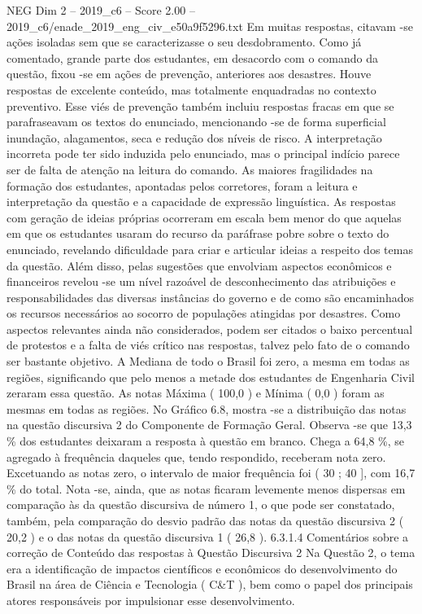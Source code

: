 \begin{textsample}{NEG Dim 2 – 2019\_c6 – Score 2.00 – 2019\_c6/enade\_2019\_eng\_civ\_e50a9f5296.txt}
Em muitas respostas, citavam -se ações isoladas sem que se caracterizasse o seu desdobramento.
Como já comentado, grande parte dos estudantes, em desacordo com o comando da questão, fixou -se em ações de prevenção, anteriores aos desastres.
Houve respostas de excelente conteúdo, mas totalmente enquadradas no contexto preventivo.
Esse viés de prevenção também incluiu respostas fracas em que se parafraseavam os textos do enunciado, mencionando -se de forma superficial inundação, alagamentos, seca e redução dos níveis de risco.
A interpretação incorreta pode ter sido induzida pelo enunciado, mas o principal indício parece ser de falta de atenção na leitura do comando.
As maiores fragilidades na formação dos estudantes, apontadas pelos corretores, foram a leitura e interpretação da questão e a capacidade de expressão linguística.
As respostas com geração de ideias próprias ocorreram em escala bem menor do que aquelas em que os estudantes usaram do recurso da paráfrase pobre sobre o texto do enunciado, revelando dificuldade para criar e articular ideias a respeito dos temas da questão.
Além disso, pelas sugestões que envolviam aspectos econômicos e financeiros revelou -se um nível razoável de desconhecimento das atribuições e responsabilidades das diversas instâncias do governo e de como são encaminhados os recursos necessários ao socorro de populações atingidas por desastres.
Como aspectos relevantes ainda não considerados, podem ser citados o baixo percentual de protestos e a falta de viés crítico nas respostas, talvez pelo fato de o comando ser bastante objetivo.
A Mediana de todo o Brasil foi zero, a mesma em todas as regiões, significando que pelo menos a metade dos estudantes de Engenharia Civil zeraram essa questão.
As notas Máxima ( 100,0 ) e Mínima ( 0,0 ) foram as mesmas em todas as regiões.
No Gráfico 6.8, mostra -se a distribuição das notas na questão discursiva 2 do Componente de Formação Geral.
Observa -se que 13,3 \% dos estudantes deixaram a resposta à questão em branco.
Chega a 64,8 \%, se agregado à frequência daqueles que, tendo respondido, receberam nota zero.
Excetuando as notas zero, o intervalo de maior frequência foi ( 30 ; 40 ], com 16,7 \% do total.
Nota -se, ainda, que as notas ficaram levemente menos dispersas em comparação às da questão discursiva de número 1, o que pode ser constatado, também, pela comparação do desvio padrão das notas da questão discursiva 2 ( 20,2 ) e o das notas da questão discursiva 1 ( 26,8 ). 6.3.1.4 Comentários sobre a correção de Conteúdo das respostas à Questão Discursiva 2 Na Questão 2, o tema era a identificação de impactos científicos e econômicos do desenvolvimento do Brasil na área de Ciência e Tecnologia ( C\&T ), bem como o papel dos principais atores responsáveis por impulsionar esse desenvolvimento.

\end{textsample}
